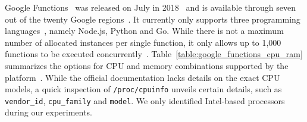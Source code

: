 Google Functions~\cite{GoogleFunctions} was released on July in 2018~\cite{GoogleFunctionsReleases} and is available through seven out of the twenty Google regions~\cite{GoogleFunctionsLocations}.
It currently only supports three programming languages~\cite{GoogleFunctionsLanguages}, namely Node.js, Python and Go. 
While there is not a maximum number of allocated instances per single function, it only allows up to 1,000 functions to be executed concurrently~\cite{GoogleFunctionsQuotas}.
Table~\ref{table:google_functions_cpu_ram} summarizes the options for CPU and memory combinations supported by the platform~\cite{GoogleFunctionsPricing}.
While the official documentation lacks details on the exact CPU models, a quick inspection of \texttt{/proc/cpuinfo} unveils certain details, such as \texttt{vendor\_id}, \texttt{cpu\_family} and \texttt{model}.
We only identified Intel-based processors during our experiments.

\begin{table}[!t]

\caption{Google Cloud Functions: Possible memory allocation and corresponding CPU frequency~\cite{GoogleFunctionsPricing}.}
\centering
{}
\label{table:google_functions_cpu_ram}
\end{table}

